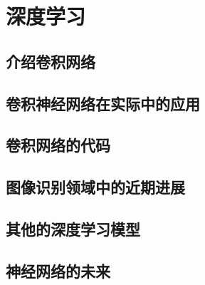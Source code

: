 
\chapter{深度学习}
\label{ch:Deeplearning}

\section{介绍卷积网络}

\section{卷积神经网络在实际中的应用}

\section{卷积网络的代码}

\section{图像识别领域中的近期进展}

\section{其他的深度学习模型}

\section{神经网络的未来}
